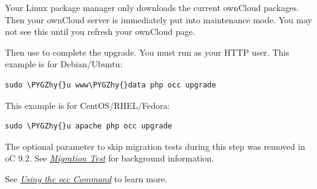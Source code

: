 \documentclass[letterpaper,10pt,english]{sphinxmanual}
\def\PYGZhy{\char`\-}
\begin{document}
Your Linux package manager only downloads the current ownCloud packages. Then
your ownCloud server is immediately put into maintenance mode. You may not see
this until you refresh your ownCloud page.
\begin{figure}[htbp]
\centering

\end{figure}

Then use  to complete the upgrade. You must run  as your HTTP
user. This example is for Debian/Ubuntu:

\begin{Verbatim}[commandchars=\\\{\}]
sudo \PYGZhy{}u www\PYGZhy{}data php occ upgrade
\end{Verbatim}

This example is for CentOS/RHEL/Fedora:

\begin{Verbatim}[commandchars=\\\{\}]
sudo \PYGZhy{}u apache php occ upgrade
\end{Verbatim}

The optional parameter to skip migration tests during this step was removed in oC 9.2.
See {\hyperref[maintenance/upgrade:migration-test-label]{\emph{Migration Test}}} for background information.

See {\hyperref[configuration_server/occ_command::doc]{\emph{Using the occ Command}}} to learn more.
\end{document}
